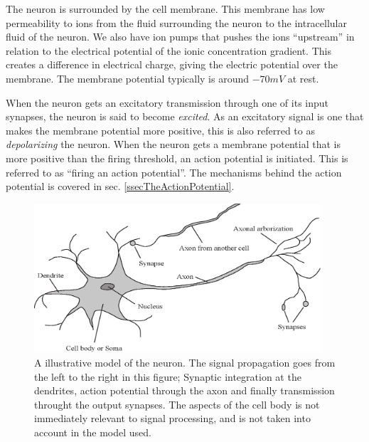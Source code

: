 
The neuron is surrounded by the cell membrane. This membrane has low permeability to ions from the fluid surrounding the neuron to the intracellular fluid of the neuron.
We also have ion pumps that pushes the ions ``upstream'' in relation to the electrical potential of the ionic concentration gradient.
This creates a difference in electrical charge, giving the electric potential over the membrane.
The membrane potential typically is around $-70mV$ at rest. %


When the neuron gets an excitatory transmission through one of its input synapses, the neuron is said to become \emph{excited}. 
As an excitatory signal is one that makes the membrane potential more positive, this is also referred to as \emph{depolarizing} the neuron.
When the neuron gets a membrane potential that is more positive than the firing threshold, an action potential is initiated.
This is referred to as ``firing an action potential''.
The mechanisms behind the action potential is covered in sec. \ref{ssecTheActionPotential}.

\begin{figure}[hbt!p]
	\centering
	\includegraphics[width=0.95\textwidth]{ModellAvNeuronet.eps}
	\caption{A illustrative model of the neuron. The signal propagation goes from the left to the right in this figure;
			Synaptic integration at the dendrites, action potential through the axon and finally transmission throught the output synapses. 
			The aspects of the cell body is not immediately relevant to signal processing, and is not taken into account in the model used. }
	\label{figFigurAvNeuronet}
\end{figure}


